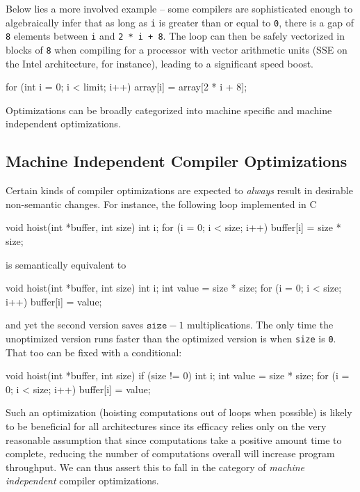 Below lies a more involved example -- some compilers are sophisticated
enough to algebraically infer that as long as \texttt{i} is greater
than or equal to \texttt{0}, there is a gap of \texttt{8} elements
between \texttt{i} and \texttt{2 * i + 8}. The loop can then be safely
vectorized in blocks of \texttt{8} when compiling for a processor with
vector arithmetic units (SSE on the Intel architecture, for instance),
leading to a significant speed boost.

\begin{ccode}
for (int i = 0; i < limit; i++) {
  array[i] = array[2 * i + 8];
}
\end{ccode}

Optimizations can be broadly categorized into machine specific and
machine independent optimizations.

\subsection{Machine Independent Compiler Optimizations}

Certain kinds of compiler optimizations are expected to
\textit{always} result in desirable non-semantic changes.  For
instance, the following loop implemented in C

\begin{ccode}
void hoist(int *buffer, int size) {
  int i;
  for (i = 0; i < size; i++) {
    buffer[i] = size * size;
  }
}
\end{ccode}

is semantically equivalent to

\begin{ccode}
void hoist(int *buffer, int size) {
  int i;
  int value = size * size;
  for (i = 0; i < size; i++) {
    buffer[i] = value;
  }
}
\end{ccode}

and yet the second version saves $\texttt{size} - 1$ multiplications.
The only time the unoptimized version runs faster than the optimized
version is when \texttt{size} is \texttt{0}.  That too can be fixed
with a conditional:

\begin{ccode}
void hoist(int *buffer, int size) {
  if (size != 0) {
    int i;
    int value = size * size;
    for (i = 0; i < size; i++) {
      buffer[i] = value;
    }
  }
}
\end{ccode}

Such an optimization (hoisting computations out of loops when
possible) is likely to be beneficial for all architectures since its
efficacy relies only on the very reasonable assumption that since
computations take a positive amount time to complete, reducing the
number of computations overall will increase program throughput.  We
can thus assert this to fall in the category of \textit{machine
  independent} compiler optimizations.

